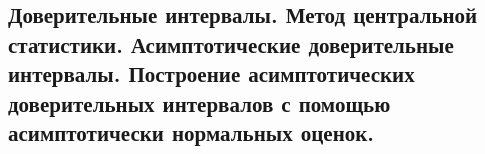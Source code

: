 \subsection{Доверительные интервалы. Метод центральной статистики. Асимптотические доверительные интервалы. Построение асимптотических доверительных интервалов с помощью асимптотически нормальных оценок.}

